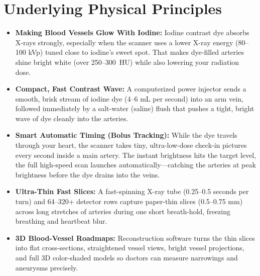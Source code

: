 \section{Underlying Physical Principles}
\begin{itemize}
    \item \textbf{Making Blood Vessels Glow With Iodine:} Iodine contrast dye absorbs X-rays strongly, especially when the scanner uses a lower X-ray energy (80--100 kVp) tuned close to iodine's sweet spot. That makes dye-filled arteries shine bright white (over 250--300~HU) while also lowering your radiation dose.
    \item \textbf{Compact, Fast Contrast Wave:} A computerized power injector sends a smooth, brisk stream of iodine dye (4--6 mL per second) into an arm vein, followed immediately by a salt-water (saline) flush that pushes a tight, bright wave of dye cleanly into the arteries.
    \item \textbf{Smart Automatic Timing (Bolus Tracking):} While the dye travels through your heart, the scanner takes tiny, ultra-low-dose check-in pictures every second inside a main artery. The instant brightness hits the target level, the full high-speed scan launches automatically---catching the arteries at peak brightness before the dye drains into the veins.
    \item \textbf{Ultra-Thin Fast Slices:} A fast-spinning X-ray tube (0.25--0.5 seconds per turn) and 64--320+ detector rows capture paper-thin slices (0.5--0.75 mm) across long stretches of arteries during one short breath-hold, freezing breathing and heartbeat blur.
    \item \textbf{3D Blood-Vessel Roadmaps:} Reconstruction software turns the thin slices into flat cross-sections, straightened vessel views, bright vessel projections, and full 3D color-shaded models so doctors can measure narrowings and aneurysms precisely.
\end{itemize}

